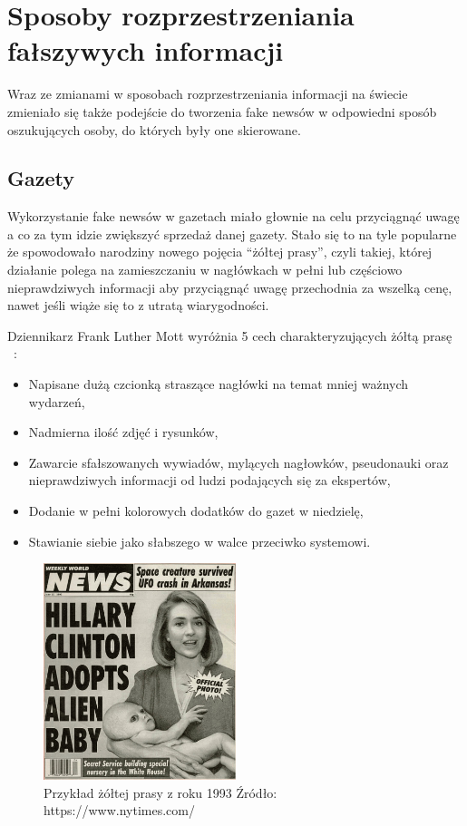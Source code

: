 \section{Sposoby rozprzestrzeniania fałszywych informacji}
Wraz ze zmianami w sposobach rozprzestrzeniania informacji na świecie zmieniało się
także podejście do tworzenia fake newsów w odpowiedni sposób oszukujących osoby, do których 
były one skierowane. 

\subsection{Gazety}
Wykorzystanie fake newsów w gazetach miało głownie na celu przyciągnąć uwagę a co za 
tym idzie zwiększyć sprzedaż danej gazety. Stało się to na tyle popularne że spowodowało
narodziny nowego pojęcia ``żółtej prasy'', czyli takiej, której działanie polega na zamieszczaniu 
w nagłówkach w pełni lub częściowo nieprawdziwych informacji aby przyciągnąć uwagę przechodnia 
za wszelką cenę, nawet jeśli wiąże się to z utratą wiarygodności. 

Dziennikarz Frank Luther Mott wyróżnia 5 cech charakteryzujących 
żółtą prasę ~\cite{YellowPressFrank}:
\begin{itemize}
    \item Napisane dużą czcionką straszące nagłówki na temat mniej ważnych wydarzeń,
    \item Nadmierna ilość zdjęć i rysunków,
    \item Zawarcie sfałszowanych wywiadów, mylących nagłowków, pseudonauki oraz nieprawdziwych informacji od ludzi podających się za ekspertów,
    \item Dodanie w pełni kolorowych dodatków do gazet w niedzielę,
    \item Stawianie siebie jako słabszego w walce przeciwko systemowi.
\end{itemize}

\begin{figure}[h!]
    \centering
    \includegraphics[width=0.5\textwidth]{./Img/fake-newspaper.jpg}
    \caption{Przykład żółtej prasy z roku 1993 Źródło: https://www.nytimes.com/}
\end{figure}

